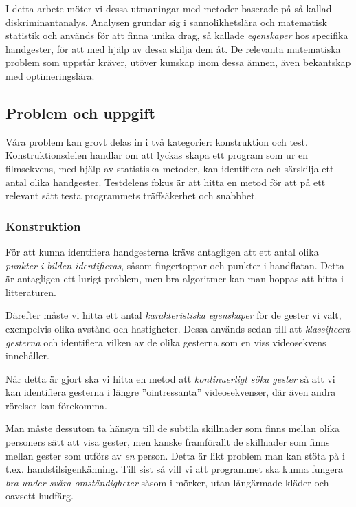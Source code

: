 \documentclass[../rapport_MVEX01-11-05]{subfiles}
\begin{document}
I detta arbete möter vi dessa utmaningar med metoder baserade på så kallad
diskriminantanalys. Analysen grundar sig i sannolikhetslära och matematisk
statistik och används för att finna unika drag, så kallade \emph{egenskaper} hos
specifika handgester, för att med hjälp av dessa skilja dem åt. De relevanta
matematiska problem som uppstår kräver, utöver kunskap inom dessa ämnen, även
bekantskap med optimeringslära.

\subsection{Problem och uppgift}

Våra problem kan grovt delas in i två kategorier: konstruktion och test.
Konstruktionsdelen handlar om att lyckas skapa ett program som ur en
filmsekvens, med hjälp av statistiska metoder, kan identifiera och särskilja ett
antal olika handgester. Testdelens fokus är att hitta en metod för att på ett
relevant sätt testa programmets träffsäkerhet och snabbhet.

\subsubsection{Konstruktion}

För att kunna identifiera handgesterna krävs
antagligen att ett antal olika \emph{punkter i bilden identifieras}, såsom
fingertoppar och punkter i handflatan. Detta är antagligen ett lurigt problem,
men bra algoritmer kan man hoppas att hitta i litteraturen.

Därefter måste vi hitta ett antal \emph{karakteristiska egenskaper} för de
gester vi valt, exempelvis olika avstånd och hastigheter.
Dessa används sedan till att \emph{klassificera gesterna} och identifiera vilken
av de olika gesterna som en viss videosekvens innehåller.

När detta är gjort ska vi hitta en metod att \emph{kontinuerligt söka gester} så
att vi kan identifiera gesterna i längre ''ointressanta''
videosekvenser, där även andra rörelser kan förekomma.

Man måste dessutom ta hänsyn till de subtila skillnader som finns
mellan olika personers sätt att visa gester, men kanske framförallt de
skillnader som finns mellan gester som utförs av \emph{en} person.
Detta är likt problem man kan stöta på i t.ex. handstilsigenkänning.
Till sist så vill vi att programmet ska kunna fungera
\emph{bra under svåra omständigheter} såsom i mörker, utan långärmade kläder och
oavsett hudfärg.
\end{document}
